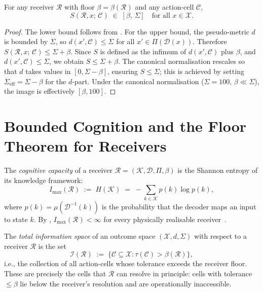\begin{lemma}
\label{lem:s-image}
For any receiver $\mathcal{R}$ with floor $\beta = \beta(\mathcal{R})$ and
any action-cell $\mathcal{C}$,
\[
  S(\mathcal{R}, x;\, \mathcal{C}) \;\in\; [\beta,\, \Sigma]
  \quad \text{for all } x \in \mathcal{X} .
\]
\end{lemma}

\begin{proof}
The lower bound follows from .  For the upper bound, the
pseudo-metric $d$ is bounded by $\Sigma$, so $d(x', \mathcal{C}) \leq \Sigma$
for all $x' \in \Pi(\mathcal{D}(x))$.  Therefore $S(\mathcal{R}, x;\,
\mathcal{C}) \leq \Sigma + \beta$.  Since $S$ is defined as the infimum of
$d(x', \mathcal{C})$ plus $\beta$, and $d(x', \mathcal{C}) \leq \Sigma$, we
obtain $S \leq \Sigma + \beta$.  The canonical normalisation rescales so that
$d$ takes values in $[0, \Sigma - \beta]$, ensuring $S \leq \Sigma$; this is
achieved by setting $\Sigma_{\mathrm{eff}} = \Sigma - \beta$ for the $d$-part.
Under the canonical normalisation ($\Sigma = 100$, $\beta \ll \Sigma$), the
image is effectively $[\beta, 100]$.
\end{proof}

\section{Bounded Cognition and the Floor Theorem for Receivers}
\label{sec:bounded-cognition-ch02}

\begin{definition}
\label{def:cognitive-capacity}
The \emph{cognitive capacity} of a receiver $\mathcal{R} = (\mathcal{K},
\mathcal{D}, \Pi, \beta)$ is the Shannon entropy of its knowledge framework:
\[
  I_{\max}(\mathcal{R}) \;:=\; H(\mathcal{K}) \;=\; -\sum_{k \in \mathcal{K}}
  p(k) \log p(k) ,
\]
where $p(k) = \mu(\mathcal{D}^{-1}(k))$ is the probability that the decoder
maps an input to state $k$.  By , $I_{\max}(\mathcal{R})
< \infty$ for every physically realisable receiver~\citep{Shannon1948,Jaynes1957}.
\end{definition}

\begin{definition}
\label{def:total-info-space}
The \emph{total information space} of an outcome space $(\mathcal{X}, d,
\Sigma)$ with respect to a receiver $\mathcal{R}$ is the set
\[
  \mathcal{I}(\mathcal{R}) \;:=\;
  \bigl\{ \mathcal{C} \subseteq \mathcal{X} : \tau(\mathcal{C}) >
  \beta(\mathcal{R}) \bigr\} ,
\]
i.e., the collection of all action-cells whose tolerance exceeds the receiver
floor.  These are precisely the cells that $\mathcal{R}$ can resolve in
principle: cells with tolerance $\leq \beta$ lie below the receiver's
resolution and are operationally inaccessible.
\end{definition}

